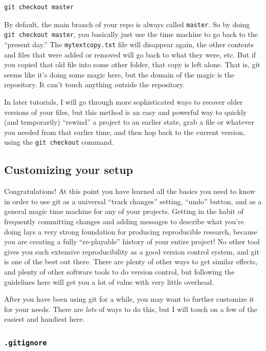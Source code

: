 \documentclass{article}
\begin{document}
\begin{verbatim}
git checkout master
\end{verbatim}

By default, the main branch of your repo is always called \texttt{master}. So by doing \texttt{git checkout master}, you basically just use the time machine to go back to the ``present day.'' The \texttt{mytextcopy.txt} file will disappear again, the other contents and files that were added or removed will go back to what they were, etc.  But if you copied that old file into some other folder, that copy is left alone.  That is, git seems like it's doing some magic here, but the domain of the magic is the repository.  It can't touch anything outside the repository.

In later tutorials, I will go through more sophisticated ways to recover older versions of your files, but this method is an easy and powerful way to quickly (and temporarily) ``rewind'' a project to an earlier state, grab a file or whatever you needed from that earlier time, and then hop back to the current version, using the \texttt{git checkout} command.
\subsection{Customizing your setup}
\label{sec-5-7}

Congratulations! At this point you have learned all the basics you need to know in order to use git as a universal ``track changes'' setting, ``undo'' button, and as a general magic time machine for any of your projects.  Getting in the habit of frequently committing changes and adding messages to describe what you're doing lays a very strong foundation for producing reproducible research, because you are creating a fully ``re-playable'' history of your entire project!  No other tool gives you such extensive reproducibility as a good version control system, and git is one of the best out there. There are plenty of other ways to get similar effects, and plenty of other software tools to do version control, but following the guidelines here will get you a lot of value with very little overhead.

After you have been using git for a while, you may want to further customize it for your needs.  There are \emph{lots} of ways to do this, but I will touch on a few of the easiest and handiest here.
\subsubsection{\texttt{.gitignore}}
\label{sec-5-7-1}
\end{document}
